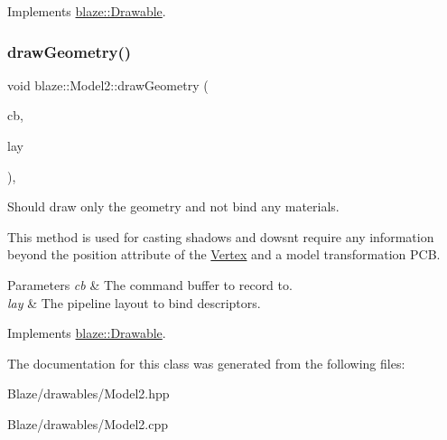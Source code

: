 Implements \hyperlink{classblaze_1_1Drawable_a810b411ced93f27781a40a170714b590}{blaze\+::\+Drawable}.

\mbox{\label{classblaze_1_1Model2_aadf59268e6faa861e27d6995a63552c3}} 
\subsubsection{\texorpdfstring{draw\+Geometry()}{drawGeometry()}}
{\footnotesize\ttfamily void blaze\+::\+Model2\+::draw\+Geometry (\begin{DoxyParamCaption}\item[{Vk\+Command\+Buffer}]{cb,  }\item[{Vk\+Pipeline\+Layout}]{lay }\end{DoxyParamCaption})\hspace{0.3cm}{\ttfamily [override]}, {\ttfamily [virtual]}}



Should draw only the geometry and not bind any materials. 

This method is used for casting shadows and dowsn\textquotesingle{}t require any information beyond the position attribute of the \hyperlink{structblaze_1_1Vertex}{Vertex} and a model transformation P\+CB.


\begin{DoxyParams}{Parameters}
{\em cb} & The command buffer to record to. \\
\hline
{\em lay} & The pipeline layout to bind descriptors. \\
\hline
\end{DoxyParams}


Implements \hyperlink{classblaze_1_1Drawable_aa2bd171547027319e4254c47e0628163}{blaze\+::\+Drawable}.



The documentation for this class was generated from the following files\+:\begin{DoxyCompactItemize}
\item 
Blaze/drawables/Model2.\+hpp\item 
Blaze/drawables/Model2.\+cpp\end{DoxyCompactItemize}
